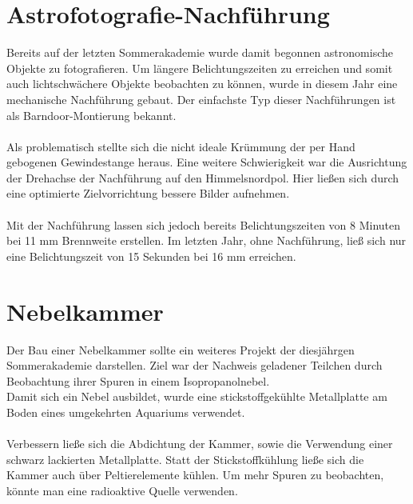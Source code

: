 \documentclass[
  bibliography=totoc,     %
  captions=tableheading,  %
  titlepage=firstiscover, %
  twocolumn,
]{scrartcl}
\begin{document}
\section{Astrofotografie-Nachführung}
Bereits auf der letzten Sommerakademie wurde damit begonnen astronomische Objekte zu fotografieren.
Um längere Belichtungszeiten zu erreichen und somit auch lichtschwächere Objekte beobachten zu können, wurde in diesem Jahr eine mechanische Nachführung gebaut.
Der einfachste Typ dieser Nachführungen ist als Barndoor-Montierung bekannt.\\
\\
Als problematisch stellte sich die nicht ideale Krümmung der per Hand gebogenen Gewindestange heraus.
Eine weitere Schwierigkeit war die Ausrichtung der Drehachse der Nachführung auf den Himmelsnordpol.
Hier ließen sich durch eine optimierte Zielvorrichtung bessere Bilder aufnehmen.\\
\\
Mit der Nachführung lassen sich jedoch bereits Belichtungszeiten von 8 Minuten bei 11 mm Brennweite erstellen.
Im letzten Jahr, ohne Nachführung, ließ sich nur eine Belichtungszeit von 15 Sekunden bei 16 mm erreichen.

\section{Nebelkammer}
Der Bau einer Nebelkammer sollte ein weiteres Projekt der diesjährgen Sommerakademie darstellen.
Ziel war der Nachweis geladener Teilchen durch Beobachtung ihrer Spuren in einem Isopropanolnebel.\\
Damit sich ein Nebel ausbildet, wurde eine stickstoffgekühlte Metallplatte am Boden eines umgekehrten Aquariums verwendet.\\
\\
Verbessern ließe sich die Abdichtung der Kammer, sowie die Verwendung einer schwarz lackierten Metallplatte.
Statt der Stickstoffkühlung ließe sich die Kammer auch über Peltierelemente kühlen.
Um mehr Spuren zu beobachten, könnte man eine radioaktive Quelle verwenden.
\end{document}
